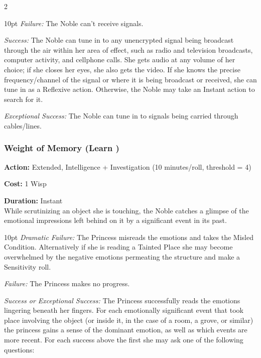 \begin{multicols}{2}
\begin{myindentpar}{10pt}
\emph{Failure:} The Noble can't receive signals.

\emph{Success:} The Noble can tune in to any unencrypted signal being broadcast through the air within her area of effect, such as radio and television broadcasts, computer activity, and cellphone calls. She gets audio at any volume of her choice; if she closes her eyes, she also gets the video. If she knows the precise frequency/channel of the signal or where it is being broadcast or received, she can tune in as a Reflexive action. Otherwise, the Noble may take an Instant action to search for it.

\emph{Exceptional Success:} The Noble can tune in to signals being carried through cables/lines.\end{myindentpar}

\subsubsection*{Weight of Memory (Learn \textbullet\textbullet)}

\noindent \textbf{Action:} Extended, Intelligence + Investigation (10 minutes/roll, threshold = 4) 

\noindent \textbf{Cost:} 1 Wisp 

\noindent \textbf{Duration:} Instant \\

While scrutinizing an object she is touching, the Noble catches a glimpse of the emotional impressions left behind on it by a significant event in its past. 

  \begin{myindentpar}{10pt}  \emph{Dramatic Failure:} The Princess misreads the emotions and takes the Misled Condition. Alternatively if she is reading a Tainted Place she may become overwhelmed by the negative emotions permeating the structure and make a Sensitivity roll.

    \emph{Failure:} The Princess makes no progress. 

    \emph{Success or Exceptional Success:} The Princess successfully reads the emotions lingering beneath her fingers. For each emotionally significant event that took place involving the object (or inside it, in the case of a room, a grove, or similar) the princess gains a sense of the dominant emotion, as well as which events are more recent. For each success above the first she may ask one of the following questions: 
	
	\begin{itemize}
	

\end{itemize}
\end{myindentpar}
\end{multicols}
